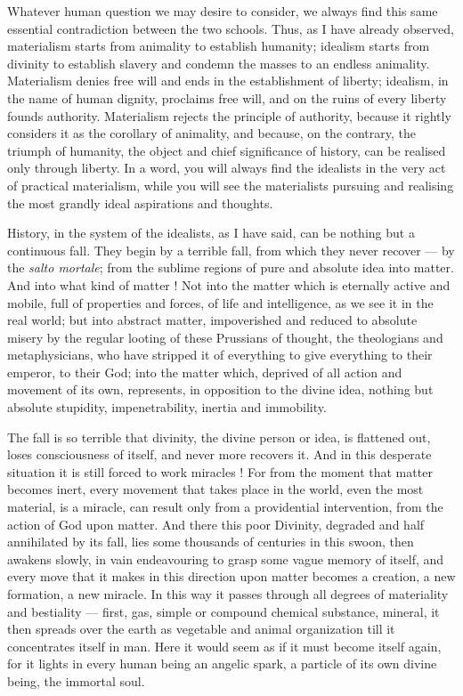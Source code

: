 \documentclass[12pt]{report}
\begin{document}
Whatever human question we may desire to consider, we always find this same essential contradiction between the two schools. Thus, as I have already observed, materialism starts from animality to establish humanity; idealism starts from divinity to establish slavery and condemn the masses to an endless animality. Materialism denies free will and ends in the establishment of liberty; idealism, in the name of human dignity, proclaims free will, and on the ruins of every liberty founds authority. Materialism rejects the principle of authority, because it rightly considers it as the corollary of animality, and because, on the contrary, the triumph of humanity, the object and chief significance of history, can be realised only through liberty. In a word, you will always find the idealists in the very act of practical materialism, while you will see the materialists pursuing and realising the most grandly ideal aspirations and thoughts.


History, in the system of the idealists, as I have said, can be nothing but a continuous fall. They begin by a terrible fall, from which they never recover — by the \emph{salto mortale}; from the sublime regions of pure and absolute idea into matter. And into what kind of matter ! Not into the matter which is eternally active and mobile, full of properties and forces, of life and intelligence, as we see it in the real world; but into abstract matter, impoverished and reduced to absolute misery by the regular looting of these Prussians of thought, the theologians and metaphysicians, who have stripped it of everything to give everything to their emperor, to their God; into the matter which, deprived of all action and movement of its own, represents, in opposition to the divine idea, nothing but absolute stupidity, impenetrability, inertia and immobility.


The fall is so terrible that divinity, the divine person or idea, is flattened out, loses consciousness of itself, and never more recovers it. And in this desperate situation it is still forced to work miracles ! For from the moment that matter becomes inert, every movement that takes place in the world, even the most material, is a miracle, can result only from a providential intervention, from the action of God upon matter. And there this poor Divinity, degraded and half annihilated by its fall, lies some thousands of centuries in this swoon, then awakens slowly, in vain endeavouring to grasp some vague memory of itself, and every move that it makes in this direction upon matter becomes a creation, a new formation, a new miracle. In this way it passes through all degrees of materiality and bestiality — first, gas, simple or compound chemical substance, mineral, it then spreads over the earth as vegetable and animal organization till it concentrates itself in man. Here it would seem as if it must become itself again, for it lights in every human being an angelic spark, a particle of its own divine being, the immortal soul.
\end{document}
